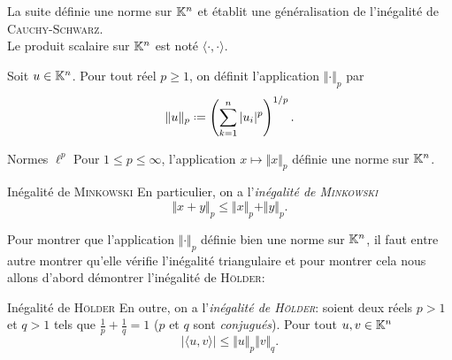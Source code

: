 La suite définie une norme sur $\mathbb{K}^n$ et établit une généralisation de l'inégalité de \textsc{Cauchy}-\textsc{Schwarz}. \\
Le produit scalaire sur $\mathbb{K}^n$ est noté $\langle \cdot, \cdot \rangle$.

\begin{defi}{}
    Soit $u \in \mathbb{K}^n$. Pour tout réel $p \geqslant 1$, on définit l'application $\Vert \bm{\cdot} \Vert_p$ par
    $$\Vert u \Vert_p \defeq \left (\sum_{k=1}^{n} |u_i|^p \right)^{1/p}.$$
\end{defi}


\begin{prop}{Normes $\ell^p$}
    Pour $1 \leqslant p \leqslant \infty$, l'application $x \mapsto \Vert x \Vert_p$ définie une norme sur $\mathbb{K}^n$. 
\end{prop}

\begin{prop}{Inégalité de \textsc{Minkowski}}
    En particulier, on a l'\emph{inégalité de \textsc{Minkowski}}
    $$\Vert x + y \Vert_p \leqslant \Vert x \Vert_p + \Vert y \Vert_p.$$
\end{prop}

Pour montrer que l'application $\Vert \bm{\cdot} \Vert_p$ définie bien une norme sur $\mathbb{K}^n$, il faut entre autre montrer qu'elle vérifie l'inégalité triangulaire et pour montrer cela nous allons d'abord démontrer l'inégalité de \textsc{Hölder}:

\begin{prop}{Inégalité de \textsc{Hölder}}
    En outre, on a l'\emph{inégalité de \textsc{Hölder}}: soient deux réels $p > 1$ et $q > 1$ tels que $\frac{1}{p} + \frac{1}{q} = 1$ ($p$ et $q$ sont \emph{conjugués}). Pour tout $u, v \in \mathbb{K}^n$
    $$|\langle u, v \rangle| \leqslant \Vert u \Vert_p \Vert v \Vert_q.$$
\end{prop}

